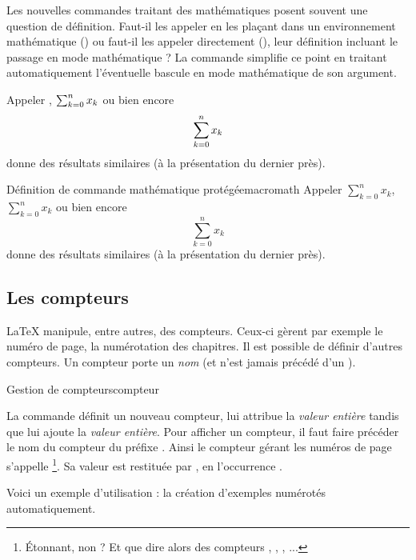 Les nouvelles commandes traitant des mathématiques posent souvent une question de définition. Faut-il les appeler en les plaçant dans un environnement mathématique () ou faut-il les appeler directement (), leur définition incluant le passage en mode mathématique ? La commande  simplifie ce point en traitant automatiquement l'éventuelle bascule en mode mathématique de son argument.

\begin{codedoublevrai}
Appeler \somme, $\somme$ ou bien encore \[\somme\] donne des résultats similaires
(à la présentation du dernier près). 
\end{codedoublevrai}

\begin{codedoublefaux}{Définition de commande mathématique protégée}{macromath}
\newcommand{\somme}{\ensuremath{\sum_{k=0}^{n} x_k}}
Appeler \somme, $\somme$ ou bien encore \[\somme\] donne des résultats similaires 
(à la présentation du dernier près). 
\end{codedoublefaux}

\subsection{Les compteurs}

\LaTeX{} manipule, entre autres, des compteurs. Ceux-ci gèrent par exemple le numéro de page, la numérotation des chapitres. Il est possible de définir d'autres compteurs. Un compteur porte un \emph{nom} (et n'est jamais précédé d'un \macro{}). 

\begin{codesimple}{Gestion de compteurs}{compteur}
\setcounter{§textit£nom¤}{§textit£valeur entière¤}
\addtocounter{§textit£nom¤}{§textit£valeur entière¤}
\end{codesimple}

La commande  définit un nouveau compteur,  lui attribue la \emph{valeur entière} tandis que  lui ajoute la \emph{valeur entière}. Pour afficher un compteur, il faut faire précéder le nom du compteur du préfixe . Ainsi le compteur gérant les numéros de page s'appelle \footnote{\'{E}tonnant, non ? Et que dire alors des compteurs , , , ...}. Sa valeur est restituée par , en l'occurrence \thepage.

Voici un exemple d'utilisation : la création d'exemples numérotés automatiquement.  


